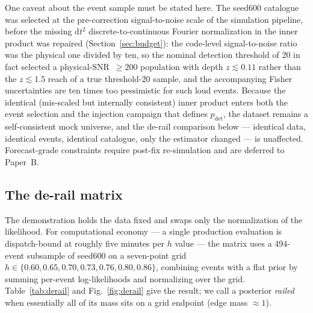One caveat about the event sample must be stated here. The seed600 catalogue was selected at the pre-correction signal-to-noise scale of the simulation pipeline, before the missing $\mathrm{d}t^2$ discrete-to-continuous Fourier normalization in the inner product was repaired (Section~\ref{sec:budget}): the code-level signal-to-noise ratio was the physical one divided by ten, so the nominal detection threshold of 20 in fact selected a physical-SNR~$\geq 200$ population with depth $z \lesssim 0.11$ rather than the $z \lesssim 1.5$ reach of a true threshold-20 sample, and the accompanying Fisher uncertainties are ten times too pessimistic for such loud events. %
Because the identical (mis-scaled but internally consistent) inner product enters both the event selection and the injection campaign that defines $p_\mathrm{det}$, the dataset remains a self-consistent mock universe, and the de-rail comparison below --- identical data, identical events, identical catalogue, only the estimator changed --- is unaffected. %
Forecast-grade constraints require post-fix re-simulation and are deferred to Paper~B.

\subsection{The de-rail matrix}

The demonstration holds the data fixed and swaps only the normalization of the likelihood. For computational economy --- a single production evaluation is dispatch-bound at roughly five minutes per $h$ value --- the matrix uses a 494-event subsample of seed600 on a seven-point grid $h \in \{0.60, 0.65, 0.70, 0.73, 0.76, 0.80, 0.86\}$, combining events with a flat prior by summing per-event log-likelihoods and normalizing over the grid. %
Table~\ref{tab:derail} and Fig.~\ref{fig:derail} give the result; we call a posterior \textit{railed} when essentially all of its mass sits on a grid endpoint (edge mass $\approx 1$).

